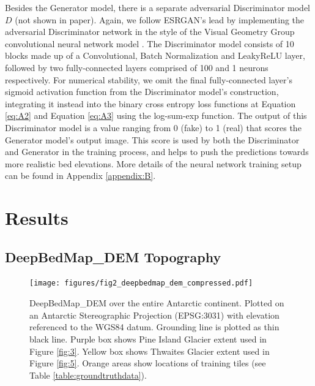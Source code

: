 \documentclass[tc, manuscript]{copernicus}
\begin{document}
Besides the Generator model, there is a separate adversarial Discriminator model $D$ (not shown in paper).
Again, we follow ESRGAN's \citep{WangESRGANEnhancedSuperResolution2019} lead by implementing the adversarial Discriminator network in the style of the Visual Geometry Group convolutional neural network model \citep[VGG,][]{SimonyanVeryDeepConvolutional2014}.
The Discriminator model consists of 10 blocks made up of a Convolutional, Batch Normalization \citep{IoffeBatchNormalizationAccelerating2015} and LeakyReLU \citep{MaasRectifiernonlinearitiesimprove2013} layer, followed by two fully-connected layers comprised of 100 and 1 neurons respectively.
For numerical stability, we omit the final fully-connected layer's sigmoid activation function from the Discriminator model's construction, integrating it instead into the binary cross entropy loss functions at Equation \eqref{eq:A2} and Equation \eqref{eq:A3} using the log-sum-exp function.
The output of this Discriminator model is a value ranging from 0 (fake) to 1 (real) that scores the Generator model's output image.
This score is used by both the Discriminator and Generator in the training process, and helps to push the predictions towards more realistic bed elevations.
More details of the neural network training setup can be found in Appendix \ref{appendix:B}.


\section{Results}

\subsection{DeepBedMap\_DEM Topography} \label{section:deepbedmapdemtopography}

\begin{figure}[htbp]
    \centering
    \texttt{[image: figures/fig2\_deepbedmap\_dem\_compressed.pdf]}
    \caption{
      DeepBedMap\_DEM over the entire Antarctic continent.
      Plotted on an Antarctic Stereographic Projection (EPSG:3031) with elevation referenced to the WGS84 datum.
      Grounding line is plotted as thin black line.
      Purple box shows Pine Island Glacier extent used in Figure \ref{fig:3}.
      Yellow box shows Thwaites Glacier extent used in Figure \ref{fig:5}.
      Orange areas show locations of training tiles (see Table \ref{table:groundtruthdata}).
    }
    \label{fig:2}
\end{figure}
\end{document}
